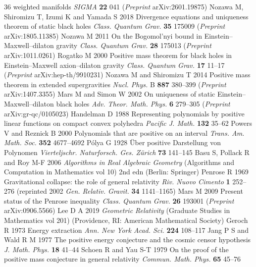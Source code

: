 \documentclass[11pt]{article}
\theoremstyle{plain}
\theoremstyle{definition}
\begin{document}
\begin{thebibliography}{36}
  weighted manifolds \emph{SIGMA} \textbf{22} 041 (\emph{Preprint} arXiv:2601.19875)
 Nozawa M, Shiromizu T, Izumi K and Yamada S 2018 Divergence equations and uniqueness
  theorem of static black holes \emph{Class. Quantum Grav.} \textbf{35} 175009 (\emph{Preprint} arXiv:1805.11385)
 Nozawa M 2011 On the Bogomol'nyi bound in Einstein--Maxwell--dilaton gravity
  \emph{Class. Quantum Grav.} \textbf{28} 175013 (\emph{Preprint} arXiv:1011.0261)
 Rogatko M 2000 Positive mass theorem for black holes in Einstein--Maxwell axion--dilaton
  gravity \emph{Class. Quantum Grav.} \textbf{17} 11--17 (\emph{Preprint} arXiv:hep-th/9910231)
 Nozawa M and Shiromizu T 2014 Positive mass theorem in extended supergravities
  \emph{Nucl. Phys.} B \textbf{887} 380--399 (\emph{Preprint} arXiv:1407.3355)
 Mars M and Simon W 2002 On uniqueness of static Einstein--Maxwell--dilaton black
  holes \emph{Adv. Theor. Math. Phys.} \textbf{6} 279--305 (\emph{Preprint} arXiv:gr-qc/0105023)
 Handelman D 1988 Representing polynomials by positive linear functions on compact convex
  polyhedra \emph{Pacific J. Math.} \textbf{132} 35--62
 Powers V and Reznick B 2000 Polynomials that are positive on an interval
  \emph{Trans. Am. Math. Soc.} \textbf{352} 4677--4692
 P\'olya G 1928 \"Uber positive Darstellung von Polynomen \emph{Vierteljschr. Naturforsch.
  Ges. Z\"urich} \textbf{73} 141--145
 Basu S, Pollack R and Roy M-F 2006 \emph{Algorithms in Real Algebraic Geometry}
  (Algorithms and Computation in Mathematics vol 10) 2nd edn (Berlin: Springer)
 Penrose R 1969 Gravitational collapse: the role of general relativity
  \emph{Riv. Nuovo Cimento} \textbf{1} 252--276 (reprinted 2002 \emph{Gen. Relativ. Gravit.} \textbf{34} 1141--1165)
 Mars M 2009 Present status of the Penrose inequality \emph{Class. Quantum Grav.} \textbf{26}
  193001 (\emph{Preprint} arXiv:0906.5566)
 Lee D A 2019 \emph{Geometric Relativity} (Graduate Studies in Mathematics vol 201)
  (Providence, RI: American Mathematical Society)
 Geroch R 1973 Energy extraction \emph{Ann. New York Acad. Sci.} \textbf{224} 108--117
 Jang P S and Wald R M 1977 The positive energy conjecture and the cosmic censor hypothesis
  \emph{J. Math. Phys.} \textbf{18} 41--44
 Schoen R and Yau S-T 1979 On the proof of the positive mass conjecture in general
  relativity \emph{Commun. Math. Phys.} \textbf{65} 45--76

\end{thebibliography}
\end{document}
